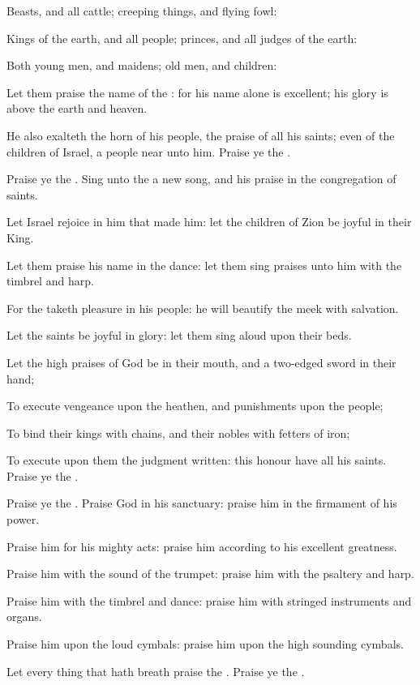 \Verse Beasts, and all cattle; creeping things, and flying fowl:

\Verse Kings of the earth, and all people; princes, and all judges of the earth:

\Verse Both young men, and maidens; old men, and children:

\Verse Let them praise the name of the \LORD: for his name alone is excellent; his glory is above the earth and heaven.

\Verse He also exalteth the horn of his people, the praise of all his saints; even of the children of Israel, a people near unto him. Praise ye the \LORD.




\Chapter
\Verse Praise ye the \LORD. Sing unto the \LORD a new song, and his praise in the congregation of saints.

\Verse Let Israel rejoice in him that made him: let the children of Zion be joyful in their King.

\Verse Let them praise his name in the dance: let them sing praises unto him with the timbrel and harp.

\Verse For the \LORD taketh pleasure in his people: he will beautify the meek with salvation.

\Verse Let the saints be joyful in glory: let them sing aloud upon their beds.

\Verse Let the high praises of God be in their mouth, and a two-edged sword in their hand;

\Verse To execute vengeance upon the heathen, and punishments upon the people;

\Verse To bind their kings with chains, and their nobles with fetters of iron;

\Verse To execute upon them the judgment written: this honour have all his saints. Praise ye the \LORD.




\Chapter
\Verse Praise ye the \LORD. Praise God in his sanctuary: praise him in the firmament of his power.

\Verse Praise him for his mighty acts: praise him according to his excellent greatness.

\Verse Praise him with the sound of the trumpet: praise him with the psaltery and harp.

\Verse Praise him with the timbrel and dance: praise him with stringed instruments and organs.

\Verse Praise him upon the loud cymbals: praise him upon the high sounding cymbals.

\Verse Let every thing that hath breath praise the \LORD. Praise ye the \LORD.

